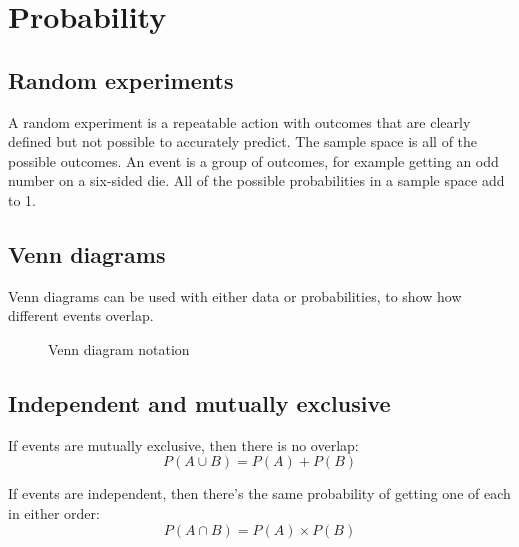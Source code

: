 \section{Probability}
\subsection{Random experiments}
A random experiment is a repeatable action with outcomes that are clearly defined but not possible to accurately predict. The sample space is all of the possible outcomes. An event is a group of outcomes, for example getting an odd number on a six-sided die. All of the possible probabilities in a sample space add to 1.

\subsection{Venn diagrams}
Venn diagrams can be used with either data or probabilities, to show how different events overlap.
\begin{figure}[ht]
    \centering
    \caption{Venn diagram notation}
    \label{fig:venn-diagram-notation}
\end{figure}

\subsection{Independent and mutually exclusive}
If events are mutually exclusive, then there is no overlap:
\begin{equation}
	P(A \cup B) = P(A) + P(B)
\end{equation}

If events are independent, then there's the same probability of getting one of each in either order:
\begin{equation}
	P(A \cap B) = P(A)\times P(B)
\end{equation}
